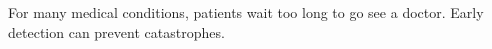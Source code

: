 For many medical conditions, patients wait too long to go see a doctor.  Early detection can prevent catastrophes.